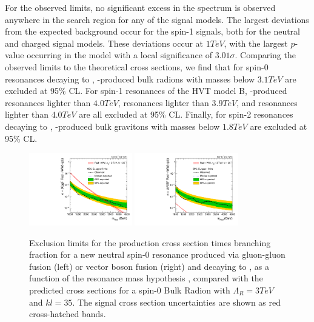 For the observed limits, no significant excess in the \MX spectrum is observed anywhere in the search region for any of the signal models.
The largest deviations from the expected background occur for the \VBF spin-1 signals, both for the neutral and charged signal models.
These deviations occur at $1\unit{TeV}$, with the largest $p$-value occurring in the \VBF\WprtoWZ model with a local significance of $3.01\sigma$.
Comparing the observed limits to the theoretical cross sections, we find that for spin-0 resonances decaying to \WW, \ggF-produced bulk radions with masses below $3.1\unit{TeV}$ are excluded at 95\% CL.
For spin-1 resonances of the HVT model B, \DY-produced \ZprtoWW resonances lighter than $4.0\unit{TeV}$, \WprtoWZ resonances lighter than $3.9\unit{TeV}$, and \WprtoWH resonances lighter than $4.0\unit{TeV}$ are all excluded at 95\% CL.
Finally, for spin-2 resonances decaying to \WW, \ggF-produced bulk gravitons with masses below $1.8\unit{TeV}$ are excluded at 95\% CL.

\begin{figure}[htbp]
  \centering
  \includegraphics[width=0.4\textwidth]{fig/results/limits_RadToWW.pdf}
  \includegraphics[width=0.4\textwidth]{fig/results/limits_VBFRadToWW.pdf}
  \caption{
    Exclusion limits for the production cross section times branching fraction for a new neutral spin-0 resonance produced via gluon-gluon fusion (left) or vector boson fusion (right) and decaying to \WW, as a function of the resonance mass hypothesis \MX, compared with the predicted cross sections for a spin-0 Bulk Radion with $\Lambda_{R}=3\unit{TeV}$ and $kl=35$.
    The signal cross section uncertainties are shown as red cross-hatched bands.
  }
  \label{fig:limits_spin0}
\end{figure}

